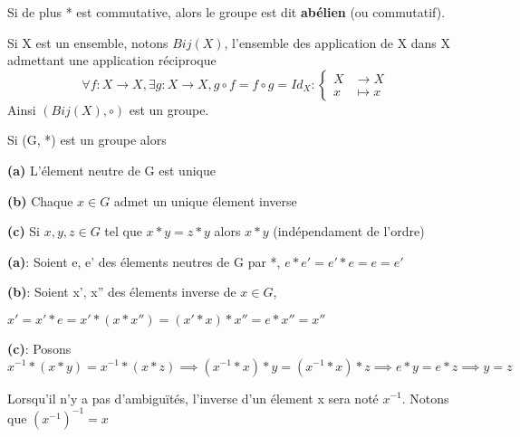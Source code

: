 \documentclass[a4paper, 12pt]{article}
\begin{document}
\begin{remark}
    Si de plus * est commutative, alors le groupe est dit \textbf{abélien} (ou commutatif).
\end{remark}

\begin{example}
    Si X est un ensemble, notons $Bij(X)$, l'ensemble des application de X dans X admettant une application réciproque
    \begin{equation*}
        \forall f: X \rightarrow X, \exists g: X \rightarrow X, g \circ f = f \circ g = Id_X:
        \begin{cases}
            X &\longrightarrow X \\
            x &\longmapsto x
        \end{cases}
    \end{equation*}
    Ainsi $(Bij(X), \circ)$ est un groupe.
\end{example}

\begin{proposition}
    Si (G, *) est un groupe alors

    \item \textbf{(a)} L'élement neutre de G est unique
    \item \textbf{(b)} Chaque $x \in G$ admet un unique élement inverse
    \item \textbf{(c)} Si $x, y, z \in G$ tel que $x * y = z * y$ alors $x * y$ (indépendament de l'ordre)
\end{proposition}

\begin{demonstration}
    \begin{rdem}
        \textbf{(a)}: Soient e, e' des élements neutres de G par *, $e * e' = e' * e = e = e'$
    \end{rdem}
    \begin{rdem}
        \textbf{(b)}: Soient x', x'' des élements inverse de $x \in G$,\par $x' = x' * e = x' * (x * x'') = (x' * x) * x'' = e * x'' = x''$
    \end{rdem}
    \begin{rdem}
        \textbf{(c)}: Posons $x^{-1} * (x * y) = x^{-1} * (x * z) \implies (x^{-1} * x) * y = (x^{-1} * x) * z \implies e * y = e * z \implies y = z$
    \end{rdem}
\end{demonstration}

\begin{remark}
    Lorsqu'il n'y a pas d'ambiguïtés, l'inverse d'un élement x sera noté $x^{-1}$. Notons que $(x^{-1})^{-1} = x$
\end{remark}
\end{document}
